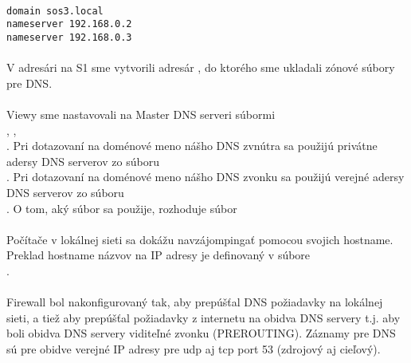 \noindent
{\selectfont

\begin{small}

\begin{verbatim}

domain sos3.local
nameserver 192.168.0.2
nameserver 192.168.0.3

\end{verbatim}

\end{small}

}

\paragraph{}
V adresári  na S1 sme vytvorili adresár , do ktorého sme ukladali zónové súbory pre DNS.
\paragraph{}
Viewy sme nastavovali na Master  DNS serveri súbormi\\ , ,\\ . Pri dotazovaní na doménové meno nášho DNS zvnútra sa použijú privátne adersy DNS serverov zo súboru\\ . Pri dotazovaní na doménové meno nášho DNS zvonku sa použijú verejné adersy DNS serverov zo súboru\\ . O tom, aký súbor sa použije, rozhoduje súbor 
\paragraph{}
Počítače v lokálnej sieti sa dokážu navzájompingať pomocou svojich hostname. Preklad hostname názvov na IP adresy je definovaný v súbore\\ .
\paragraph{}
Firewall bol nakonfigurovaný tak, aby prepúšťal DNS požiadavky na lokálnej sieti, a tiež aby prepúšťal požiadavky z internetu na obidva DNS servery t.j. aby boli obidva DNS servery viditeľné zvonku (PREROUTING). Záznamy pre DNS sú pre obidve verejné IP adresy pre udp aj tcp port 53 (zdrojový aj cieľový).
